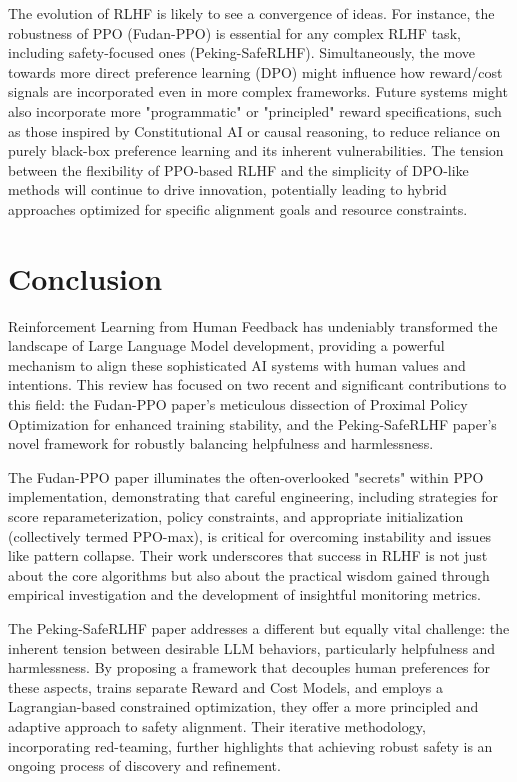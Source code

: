 \documentclass{article} %
\begin{document}
The evolution of RLHF is likely to see a convergence of ideas. For instance, the robustness of PPO (Fudan-PPO) is essential for any complex RLHF task, including safety-focused ones (Peking-SafeRLHF). Simultaneously, the move towards more direct preference learning (DPO) might influence how reward/cost signals are incorporated even in more complex frameworks. Future systems might also incorporate more "programmatic" or "principled" reward specifications, such as those inspired by Constitutional AI or causal reasoning, to reduce reliance on purely black-box preference learning and its inherent vulnerabilities. The tension between the flexibility of PPO-based RLHF and the simplicity of DPO-like methods will continue to drive innovation, potentially leading to hybrid approaches optimized for specific alignment goals and resource constraints.

\section{Conclusion}
\label{sec:conclusion}

Reinforcement Learning from Human Feedback has undeniably transformed the landscape of Large Language Model development, providing a powerful mechanism to align these sophisticated AI systems with human values and intentions. This review has focused on two recent and significant contributions to this field: the Fudan-PPO paper's meticulous dissection of Proximal Policy Optimization for enhanced training stability, and the Peking-SafeRLHF paper's novel framework for robustly balancing helpfulness and harmlessness.  

The Fudan-PPO paper illuminates the often-overlooked "secrets" within PPO implementation, demonstrating that careful engineering, including strategies for score reparameterization, policy constraints, and appropriate initialization (collectively termed PPO-max), is critical for overcoming instability and issues like pattern collapse. Their work underscores that success in RLHF is not just about the core algorithms but also about the practical wisdom gained through empirical investigation and the development of insightful monitoring metrics.

The Peking-SafeRLHF paper addresses a different but equally vital challenge: the inherent tension between desirable LLM behaviors, particularly helpfulness and harmlessness. By proposing a framework that decouples human preferences for these aspects, trains separate Reward and Cost Models, and employs a Lagrangian-based constrained optimization, they offer a more principled and adaptive approach to safety alignment. Their iterative methodology, incorporating red-teaming, further highlights that achieving robust safety is an ongoing process of discovery and refinement.
\end{document}
